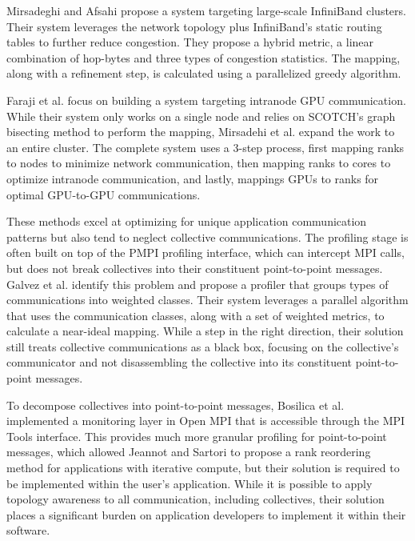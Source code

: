 Mirsadeghi and Afsahi \cite{Mirsadeghi2016PTRAM} propose a system targeting large-scale InfiniBand clusters.
Their system leverages the network topology plus InfiniBand's static routing tables to further reduce congestion.
They propose a hybrid metric, a linear combination of hop-bytes and three types of congestion statistics. 
The mapping, along with a refinement step, is calculated using a parallelized greedy algorithm.

Faraji et al. \cite{Faraji2016TopoAwareGPUSelection} focus on building a system targeting intranode \gls{GPU} communication.
While their system only works on a single node and relies on SCOTCH's \cite{Pellegrini2012SCOTCH} graph bisecting method to perform the mapping, Mirsadehi et al. \cite{Mirsadeghi2016MAGC} expand the work to an entire cluster.
The complete system uses a 3-step process, first mapping ranks to nodes to minimize network communication, then mapping ranks to cores to optimize intranode communication, and lastly, mappings \gls{GPU}s to ranks for optimal \gls{GPU}-to-\gls{GPU} communications.

These methods excel at optimizing for unique application communication patterns but also tend to neglect collective communications.
The profiling stage is often built on top of the PMPI profiling interface, which can intercept \gls{MPI} calls, but does not break collectives into their constituent point-to-point messages.
Galvez et al. \cite{Galvez2017AutoTopoMap} identify this problem and propose a profiler that groups types of communications into weighted classes.
Their system leverages a parallel algorithm that uses the communication classes, along with a set of weighted metrics, to calculate a near-ideal mapping.
While a step in the right direction, their solution still treats collective communications as a black box, focusing on the collective's communicator and not disassembling the collective into its constituent point-to-point messages.

To decompose collectives into point-to-point messages, Bosilica et al. \cite{Bosilica2017OnlineMonitoringMPI} implemented a monitoring layer in Open MPI that is accessible through the \gls{MPI} Tools interface.
This provides much more granular profiling for point-to-point messages, which allowed Jeannot and Sartori \cite{Jeannot2020ImprvMPICommMonitoring} to propose a rank reordering method for applications with iterative compute, but their solution is required to be implemented within the user's application. 
While it is possible to apply topology awareness to all communication, including collectives, their solution places a significant burden on application developers to implement it within their software.

